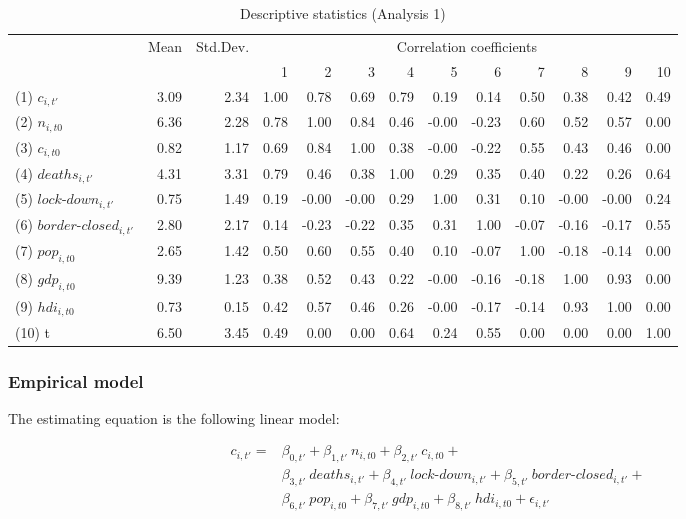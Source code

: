 \begin{table}[ht]
\caption{Descriptive statistics (Analysis 1)}
\label{tab:DescriptivesAnalysis1}
\centering
\begin{tabular}{lrrrrrrrrrrrr}
  & Mean & Std.Dev. & \multicolumn{10}{c}{Correlation coefficients}  \\ 
 &  &  & 1 & 2 & 3 & 4 & 5 & 6 & 7 & 8 & 9 & 10 \\ 
  \hline
(1) $c_{i,t'}$ & 3.09 & 2.34 & 1.00 & 0.78 & 0.69 & 0.79 & 0.19 & 0.14 & 0.50 & 0.38 & 0.42 & 0.49 \\ 
 (2) $n_{i,t0}$ & 6.36 & 2.28 & 0.78 & 1.00 & 0.84 & 0.46 & -0.00 & -0.23 & 0.60 & 0.52 & 0.57 & 0.00 \\ 
 (3) $c_{i,t0}$ & 0.82 & 1.17 & 0.69 & 0.84 & 1.00 & 0.38 & -0.00 & -0.22 & 0.55 & 0.43 & 0.46 & 0.00 \\ 
 (4) $deaths_{i,t'}$ & 4.31 & 3.31 & 0.79 & 0.46 & 0.38 & 1.00 & 0.29 & 0.35 & 0.40 & 0.22 & 0.26 & 0.64 \\ 
 (5) $lock\text{-}down_{i,t'}$ & 0.75 & 1.49 & 0.19 & -0.00 & -0.00 & 0.29 & 1.00 & 0.31 & 0.10 & -0.00 & -0.00 & 0.24 \\ 
 (6) $border\text{-}closed_{i,t'}$ & 2.80 & 2.17 & 0.14 & -0.23 & -0.22 & 0.35 & 0.31 & 1.00 & -0.07 & -0.16 & -0.17 & 0.55 \\ 
 (7) $pop_{i,t0}$ & 2.65 & 1.42 & 0.50 & 0.60 & 0.55 & 0.40 & 0.10 & -0.07 & 1.00 & -0.18 & -0.14 & 0.00 \\ 
 (8) $gdp_{i,t0}$ & 9.39 & 1.23 & 0.38 & 0.52 & 0.43 & 0.22 & -0.00 & -0.16 & -0.18 & 1.00 & 0.93 & 0.00 \\ 
 (9) $hdi_{i,t0}$ & 0.73 & 0.15 & 0.42 & 0.57 & 0.46 & 0.26 & -0.00 & -0.17 & -0.14 & 0.93 & 1.00 & 0.00 \\ 
  (10) t & 6.50 & 3.45 & 0.49 & 0.00 & 0.00 & 0.64 & 0.24 & 0.55 & 0.00 & 0.00 & 0.00 & 1.00 \\ 
   \hline
\end{tabular}
\end{table}


\subsubsection{Empirical model}

The estimating equation is the following linear model:

\begin{align*}
c_{i,t'}  = & \beta_{0,t'} + \beta_{1,t'} \: n_{i,t0} + \beta_{2,t'} \: c_{i,t0} + \\ 
 & \beta_{3,t'} \: deaths_{i,t'} + \beta_{4,t'} \: lock\text{-}down_{i,t'} + \beta_{5,t'} \: border\text{-}closed_{i,t'} + \\
 & \beta_{6,t'} \: pop_{i,t0} + \beta_{7,t'} \: gdp_{i,t0} +  \beta_{8,t'} \: hdi_{i,t0} + \epsilon_{i,t'}
\end{align*}

